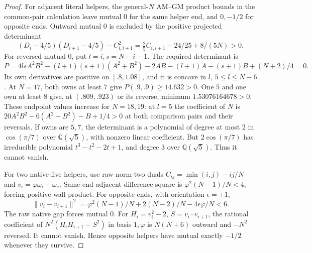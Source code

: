 \documentclass[11pt]{article}
\theoremstyle{definition}
\theoremstyle{remark}
\newcommand{\norm}[1]{\lVert #1\rVert}
\begin{document}
\begin{proof}
For adjacent literal helpers, the general-\(N\)
AM--GM product bounds in the common-pair calculation
leave mutual \(0\) for the same helper end, and
\(0,-1/2\) for opposite ends. Outward mutual \(0\)
is excluded by the positive projected determinant
\[
 (D_i-4/5)(D_{i+1}-4/5)-C_{i,i+1}^2
 =\tfrac25C_{i,i+1}-24/25+8/(5N)>0.
\]
For reversed mutual \(0\), put \(l=i,s=N-i-1\).
The required determinant is
\[
 P=4lsA^2B^2-(l+1)(s+1)(A^2+B^2)-2AB
 -(l+1)A-(s+1)B+(N+2)/4=0.
\]
Its own derivatives are positive on \([.8,1.08]\),
and it is concave in \(l\), \(5\leq l\leq N-6\).
At \(N=17\), both owns at least \(7\) give
\(P(.9,.9)\geq14.632>0\). One \(5\) and one own at
least \(8\) give, at \((.809,.923)\) or its reverse,
minimum \(1.53076164678>0\).
These endpoint values increase for \(N=18,19\):
at \(l=5\) the coefficient of \(N\) is
\(20A^2B^2-6(A^2+B^2)-B+1/4>0\)
at both comparison pairs and their reversals.
If owns are \(5,7\), the determinant is a polynomial
of degree at most \(2\) in \(\cos(\pi/7)\) over
\(\mathbb Q(\sqrt5)\), with nonzero linear coefficient.
But \(2\cos(\pi/7)\) has irreducible polynomial
\(t^3-t^2-2t+1\), and degree \(3\) over
\(\mathbb Q(\sqrt5)\). Thus it cannot vanish.

For two native-five helpers, use raw norm-two duals
\(C_{ij}=\min(i,j)-ij/N\) and
\(v_i=\varphi\omega_i+\omega_e\).
Same-end adjacent difference square is
\(\varphi^2(N-1)/N<4\), forcing positive wall product.
For opposite ends, with orientation \(\epsilon=\pm1\),
\[
 \norm{v_i-v_{i+1}}^2=
 \varphi^2(N-1)/N+2(N-2)/N-4\epsilon\varphi/N<6.
\]
The raw native gap forces mutual \(0\).
For \(H_i=v_i^2-2\), \(S=v_i\cdot v_{i+1}\),
the rational coefficient of
 \(N^2(H_iH_{i+1}-S^2)\) in basis \(1,\varphi\)
is \(N(N+6)\) outward and \(-N^2\) reversed.
It cannot vanish. Hence opposite helpers have
mutual exactly \(-1/2\) whenever they survive.


\end{proof}
\end{document}
